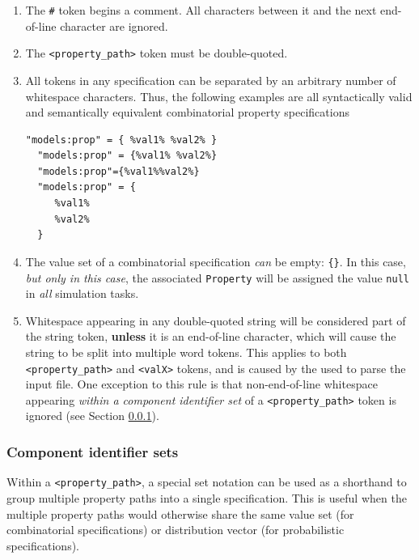 \documentclass{article}
\begin{document}
\begin{enumerate}

\item The {\tt \#} token begins a comment. All characters between it and the next end-of-line character are ignored.

\item The {\tt <property\_path>} token must be double-quoted.

\item All tokens in any specification can be separated by an arbitrary number of whitespace characters. Thus, the following examples are all syntactically valid and semantically equivalent combinatorial property specifications

\begin{lstlisting}[]
  "models:prop" = { %val1% %val2% }
  "models:prop" = {%val1% %val2%}
  "models:prop"={%val1%%val2%}
  "models:prop" = {
     %val1%
     %val2%
  }
\end{lstlisting}

\item The value set of a combinatorial specification \textit{can} be empty: {\tt \{\}}. In this case, \textit{but only in this case}, the associated {\tt Property} will be assigned the value {\tt null} in \textit{all} simulation tasks.

\item Whitespace appearing in any double-quoted string will be considered part of the string token, \textbf{unless} it is an end-of-line character, which will cause the string to be split into multiple word tokens. This applies to both {\tt <property\_path>} and {\tt <valX>} tokens, and is caused by the  used to parse the input file. One exception to this rule is that non-end-of-line whitespace appearing \textit{within a component identifier set} of a {\tt <property\_path>} token is ignored (see Section \ref{psl:prop-spec:comp-id-set}).

\end{enumerate}

\subsubsection{Component identifier sets}
\label{psl:prop-spec:comp-id-set}

Within a {\tt <property\_path>}, a special set notation can be used as a shorthand to group multiple property paths into a single specification. This is useful when the multiple property paths would otherwise share the same value set (for combinatorial specifications) or distribution vector (for probabilistic specifications).
\end{document}
